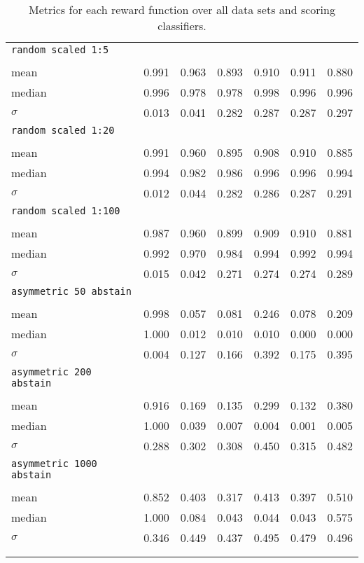 \begin{center}
\begin{longtabu}{>{\scriptsize}l|>{\scriptsize}l|>{\scriptsize}l|>{\scriptsize}l|>{\scriptsize}l|>{\scriptsize}l|>{\scriptsize}l}
\hline
\texttt{random scaled 1:5} &&&&&& \\ &&&&&&\\
mean &0.991 &0.963 &0.893 &0.910 &0.911 &0.880 \\
median &0.996 &0.978 &0.978 &0.998 &0.996 &0.996 \\
$\sigma$ &0.013 &0.041 &0.282 &0.287 &0.287 &0.297 \\
\hline
\texttt{random scaled 1:20} &&&&&& \\ &&&&&&\\
mean &0.991 &0.960 &0.895 &0.908 &0.910 &0.885 \\
median &0.994 &0.982 &0.986 &0.996 &0.996 &0.994 \\
$\sigma$ &0.012 &0.044 &0.282 &0.286 &0.287 &0.291 \\
\hline
\texttt{random scaled 1:100} &&&&&& \\ &&&&&&\\
mean &0.987 &0.960 &0.899 &0.909 &0.910 &0.881 \\
median &0.992 &0.970 &0.984 &0.994 &0.992 &0.994 \\
$\sigma$ &0.015 &0.042 &0.271 &0.274 &0.274 &0.289 \\
\hline
\texttt{asymmetric 50 abstain} &&&&&& \\ &&&&&&\\
mean &0.998 &0.057 &0.081 &0.246 &0.078 &0.209 \\
median &1.000 &0.012 &0.010 &0.010 &0.000 &0.000 \\
$\sigma$ &0.004 &0.127 &0.166 &0.392 &0.175 &0.395 \\
\hline
\texttt{asymmetric 200 abstain} &&&&&& \\ &&&&&&\\
mean &0.916 &0.169 &0.135 &0.299 &0.132 &0.380 \\
median &1.000 &0.039 &0.007 &0.004 &0.001 &0.005 \\
$\sigma$ &0.288 &0.302 &0.308 &0.450 &0.315 &0.482 \\
\hline
\texttt{asymmetric 1000 abstain} &&&&&& \\ &&&&&&\\
mean &0.852 &0.403 &0.317 &0.413 &0.397 &0.510 \\
median &1.000 &0.084 &0.043 &0.044 &0.043 &0.575 \\
$\sigma$ &0.346 &0.449 &0.437 &0.495 &0.479 &0.496 \\
  &&&&&&\\
  \caption{Metrics for each reward function over all data
    sets and scoring classifiers.}
\end{longtabu}
\end{center}
